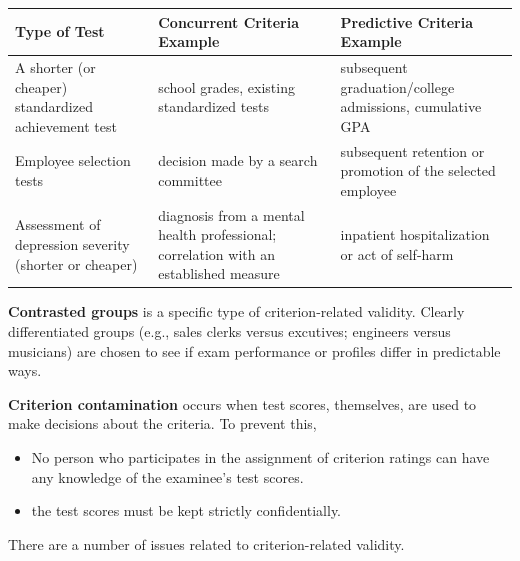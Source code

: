 \documentclass[
  english,
]{book}
\providecommand{\tightlist}{%
  \setlength{\itemsep}{0pt}\setlength{\parskip}{0pt}}
\begin{document}
\begin{longtable}[]{@{}
  >{\raggedright\arraybackslash}p{}
  >{\raggedright\arraybackslash}p{}
  >{\raggedright\arraybackslash}p{}@{}}
\toprule
Type of Test & Concurrent Criteria Example & Predictive Criteria Example \\
\midrule
\endhead
A shorter (or cheaper) standardized achievement test & school grades, existing standardized tests & subsequent graduation/college admissions, cumulative GPA \\
Employee selection tests & decision made by a search committee & subsequent retention or promotion of the selected employee \\
Assessment of depression severity (shorter or cheaper) & diagnosis from a mental health professional; correlation with an established measure & inpatient hospitalization or act of self-harm \\
\bottomrule
\end{longtable}

\textbf{Contrasted groups} is a specific type of criterion-related validity. Clearly differentiated groups (e.g., sales clerks versus excutives; engineers versus musicians) are chosen to see if exam performance or profiles differ in predictable ways.

\textbf{Criterion contamination} occurs when test scores, themselves, are used to make decisions about the criteria. To prevent this,

\begin{itemize}
\tightlist
\item
  No person who participates in the assignment of criterion ratings can have any knowledge of the examinee's test scores.\\
\item
  the test scores must be kept strictly confidentially.
\end{itemize}

There are a number of issues related to criterion-related validity.
\end{document}
